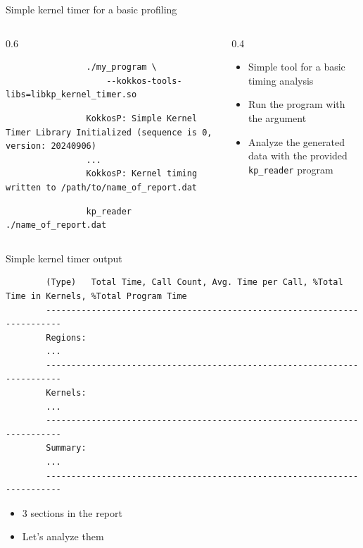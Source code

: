 \documentclass[
    aspectratio=169,
]{beamer}
\begin{document}
\begin{frame}[fragile]{Simple kernel timer for a basic profiling}
    \begin{columns}
        \begin{column}{0.6\linewidth}
            \begin{verbatim}
                ./my_program \
                    --kokkos-tools-libs=libkp_kernel_timer.so
            \end{verbatim}

            \begin{verbatim}
                KokkosP: Simple Kernel Timer Library Initialized (sequence is 0, version: 20240906)
                ...
                KokkosP: Kernel timing written to /path/to/name_of_report.dat
            \end{verbatim}

            \begin{verbatim}
                kp_reader ./name_of_report.dat
            \end{verbatim}
        \end{column}
        \begin{column}{0.4\linewidth}
            \begin{itemize}
                \item Simple tool for a basic timing analysis
                \item Run the program with the argument
                \item Analyze the generated data with the provided \texttt{kp\_reader} program
            \end{itemize}
        \end{column}
    \end{columns}
\end{frame}

\begin{frame}[fragile]{Simple kernel timer output}
    \begin{verbatim}
        (Type)   Total Time, Call Count, Avg. Time per Call, %Total Time in Kernels, %Total Program Time
        -------------------------------------------------------------------------
        Regions:
        ...
        -------------------------------------------------------------------------
        Kernels:
        ...
        -------------------------------------------------------------------------
        Summary:
        ...
        -------------------------------------------------------------------------
    \end{verbatim}
    \begin{itemize}
        \item 3 sections in the report
        \item Let's analyze them
    \end{itemize}
\end{frame}
\end{document}
